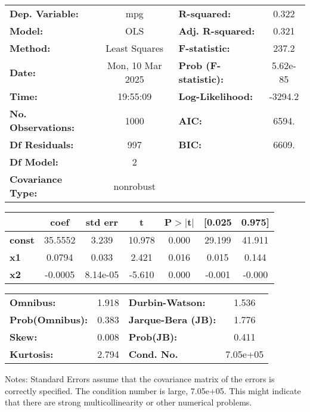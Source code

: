 \begin{center}
\begin{tabular}{lclc}
\toprule
\textbf{Dep. Variable:}    &       mpg        & \textbf{  R-squared:         } &     0.322   \\
\textbf{Model:}            &       OLS        & \textbf{  Adj. R-squared:    } &     0.321   \\
\textbf{Method:}           &  Least Squares   & \textbf{  F-statistic:       } &     237.2   \\
\textbf{Date:}             & Mon, 10 Mar 2025 & \textbf{  Prob (F-statistic):} &  5.62e-85   \\
\textbf{Time:}             &     19:55:09     & \textbf{  Log-Likelihood:    } &   -3294.2   \\
\textbf{No. Observations:} &        1000      & \textbf{  AIC:               } &     6594.   \\
\textbf{Df Residuals:}     &         997      & \textbf{  BIC:               } &     6609.   \\
\textbf{Df Model:}         &           2      & \textbf{                     } &             \\
\textbf{Covariance Type:}  &    nonrobust     & \textbf{                     } &             \\
\bottomrule
\end{tabular}
\begin{tabular}{lcccccc}
               & \textbf{coef} & \textbf{std err} & \textbf{t} & \textbf{P$> |$t$|$} & \textbf{[0.025} & \textbf{0.975]}  \\
\midrule
\textbf{const} &      35.5552  &        3.239     &    10.978  &         0.000        &       29.199    &       41.911     \\
\textbf{x1}    &       0.0794  &        0.033     &     2.421  &         0.016        &        0.015    &        0.144     \\
\textbf{x2}    &      -0.0005  &     8.14e-05     &    -5.610  &         0.000        &       -0.001    &       -0.000     \\
\bottomrule
\end{tabular}
\begin{tabular}{lclc}
\textbf{Omnibus:}       &  1.918 & \textbf{  Durbin-Watson:     } &    1.536  \\
\textbf{Prob(Omnibus):} &  0.383 & \textbf{  Jarque-Bera (JB):  } &    1.776  \\
\textbf{Skew:}          &  0.008 & \textbf{  Prob(JB):          } &    0.411  \\
\textbf{Kurtosis:}      &  2.794 & \textbf{  Cond. No.          } & 7.05e+05  \\
\bottomrule
\end{tabular}
\end{center}

Notes: \newline
 [1] Standard Errors assume that the covariance matrix of the errors is correctly specified. \newline
 [2] The condition number is large, 7.05e+05. This might indicate that there are \newline
 strong multicollinearity or other numerical problems.